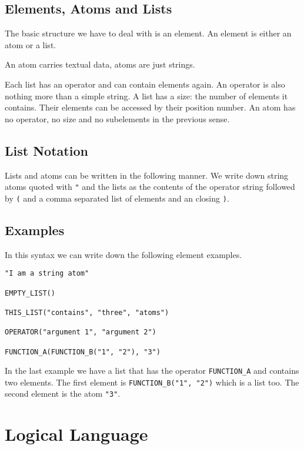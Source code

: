 \documentclass[a4paper,german,10pt,twoside]{book}
\theoremstyle{definition}
\theoremstyle{remark}
\begin{document}
\section{Elements, Atoms and Lists} \label{chapter1_section0} \hypertarget{chapter1_section0}{}
The basic structure we have to deal with is an element. An element is either an atom or a list. 

\par
An atom carries textual data, atoms are just strings.      

\par
Each list has an operator and can contain elements again. An operator is also nothing more than a simple string. A list has a size: the number of elements it contains.  Their elements can be accessed by their position number. An atom has no operator, no size and no subelements in the previous sense.

\section{List Notation} \label{chapter1_section1} \hypertarget{chapter1_section1}{}
Lists and atoms can be written in the following manner.
We write down string atoms quoted with {\tt "} and the lists as the contents of the operator string followed by {\tt (} and a comma separated list of elements and an closing {\tt )}.

\section{Examples} \label{chapter1_section2} \hypertarget{chapter1_section2}{}
In this syntax we can write down the following element examples.

\begin{verbatim}
"I am a string atom"

EMPTY_LIST()

THIS_LIST("contains", "three", "atoms")

OPERATOR("argument 1", "argument 2")

FUNCTION_A(FUNCTION_B("1", "2"), "3")
\end{verbatim}

In the last example we have a list that has the operator \verb#FUNCTION_A# and contains two elements. The first element is \verb#FUNCTION_B("1", "2")# which is a list too. The second element is the atom \verb#"3"#.



\chapter{Logical Language} \label{chapter2} \hypertarget{chapter2}{}
\end{document}
